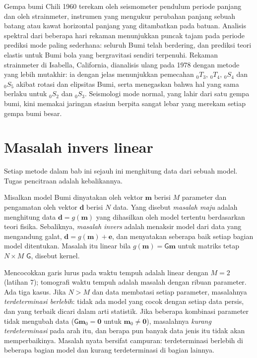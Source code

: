 \begin{history}
Gempa bumi Chili 1960 terekam oleh seismometer pendulum periode panjang
dan oleh strainmeter, instrumen yang mengukur perubahan panjang sebuah
batang atau kawat horizontal panjang yang ditambatkan pada batuan. Analisis spektral dari beberapa hari
rekaman menunjukkan puncak tajam pada periode prediksi mode paling sederhana: seluruh
Bumi telah berdering, dan prediksi teori elastis
untuk Bumi bola yang bergravitasi sendiri terpenuhi. Rekaman strainmeter
di Isabella, California, dianalisis ulang pada 1978 dengan metode yang lebih
mutakhir: ia dengan jelas menunjukkan pemecahan ${}_0T_3$, ${}_0T_4$, ${}_0S_4$
dan ${}_0S_5$ akibat rotasi dan elipsitas Bumi, serta menegaskan bahwa
hal yang sama berlaku untuk ${}_0S_2$ dan ${}_0S_3$.
Seismologi mode normal, yang lahir dari satu gempa bumi, kini memakai jaringan
stasiun berpita sangat lebar yang merekam setiap gempa bumi besar.
\end{history}

\section{Masalah invers linear}\label{sec:b3:seismology-imaging:inverse}

Setiap metode dalam bab ini sejauh ini menghitung data dari sebuah model. Tugas
pencitraan adalah kebalikannya.

\begin{definition}\label{def:b3:seismology-imaging:inverse}
Misalkan model Bumi dinyatakan oleh vektor $\mathbf m$ berisi $M$ parameter
dan pengamatan oleh vektor $\mathbf d$ berisi $N$ data. Yang disebut \emph{masalah
maju} adalah menghitung data $\mathbf d = g(\mathbf m)$
yang dihasilkan oleh model tertentu berdasarkan teori fisika. Sebaliknya, \emph{masalah
invers} adalah menaksir model dari data yang mengandung
galat, $\mathbf d = g(\mathbf m) + \mathbf e$, dan menyatakan seberapa baik setiap bagian
model ditentukan. Masalah itu linear bila $g(\mathbf m) =
\mathsf G\mathbf m$ untuk matriks tetap $N\times M$ $\mathsf G$, disebut kernel.
\end{definition}

Mencocokkan garis lurus pada waktu tempuh adalah  linear dengan
$M = 2$ (latihan 7); tomografi waktu tempuh adalah masalah dengan ribuan
parameter. Ada tiga kasus. Jika $N > M$ dan data membatasi setiap
parameter, masalahnya \emph{terdeterminasi berlebih}: tidak ada model yang cocok dengan setiap data
persis, dan yang terbaik dicari dalam arti statistik. Jika beberapa kombinasi
parameter tidak mengubah data ($\mathsf G\mathbf m_0 = \mathbf 0$ untuk
$\mathbf m_0 \ne \mathbf 0$), masalahnya \emph{kurang terdeterminasi} pada
arah itu, dan berapa pun banyak data jenis itu tidak akan memperbaikinya. Masalah nyata
bersifat campuran: terdeterminasi berlebih di beberapa bagian model dan kurang terdeterminasi di
bagian lainnya.

